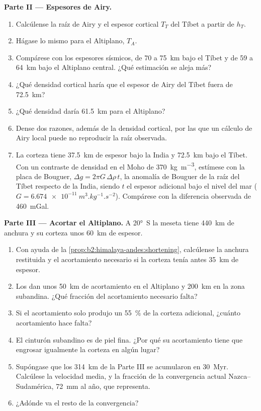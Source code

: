 \begin{problem}
\noindent\textbf{Parte II --- Espesores de Airy.}
\begin{enumerate}[resume]
\item Calcúlense la raíz de Airy y el espesor cortical $T_T$ del Tíbet a partir de $h_T$.
\item Hágase lo mismo para el Altiplano, $T_A$.
\item Compárese con los espesores sísmicos, de 70 a \qty{75}{km} bajo el Tíbet y de 59 a
\qty{64}{km} bajo el Altiplano central. ¿Qué estimación se aleja más?
\item ¿Qué densidad cortical haría que el espesor de Airy del Tíbet fuera de \qty{72.5}{km}?
\item ¿Qué densidad daría \qty{61.5}{km} para el Altiplano?
\item Dense dos razones, además de la densidad cortical, por las que un cálculo de Airy local puede
no reproducir la raíz observada.
\item La corteza tiene \qty{37.5}{km} de espesor bajo la India y \qty{72.5}{km} bajo el Tíbet. Con un
contraste de densidad en el Moho de \qty{370}{kg.m^{-3}}, estímese con la placa de Bouguer, $\Delta g
= 2\pi G\,\Delta\rho\,t$, la anomalía de Bouguer de la raíz del Tíbet respecto de la India, siendo $t$ el
espesor adicional bajo el nivel del mar ($G = \qty{6.674e-11}{m^3.kg^{-1}.s^{-2}}$). Compárese con la
diferencia observada de \qty{460}{mGal}.
\end{enumerate}

\noindent\textbf{Parte III --- Acortar el Altiplano.} A \ang{20}~S la meseta tiene
\qty{440}{km} de anchura y su corteza unos \qty{60}{km} de espesor.
\begin{enumerate}[resume]
\item Con ayuda de la \cref{prop:b2:himalaya-andes:shortening}, calcúlense la anchura restituida y el
acortamiento necesario si la corteza tenía antes \qty{35}{km} de espesor.
\item Los  dan unos \qty{50}{km} de acortamiento en el Altiplano y
\qty{200}{km} en la zona subandina. ¿Qué fracción del acortamiento necesario falta?
\item Si el acortamiento solo produjo un \qty{55}{\percent} de la corteza adicional, ¿cuánto acortamiento hace
falta?
\item El cinturón subandino es de piel fina. ¿Por qué su acortamiento tiene que engrosar igualmente la corteza
en algún lugar?
\item Supóngase que los \qty{314}{km} de la Parte III se acumularon en \qty{30}{Myr}. Calcúlese la velocidad
media, y la fracción de la convergencia actual Nazca--Sudamérica, \qty{72}{mm} al año, que
representa.
\item ¿Adónde va el resto de la convergencia?
\end{enumerate}


\end{problem}
